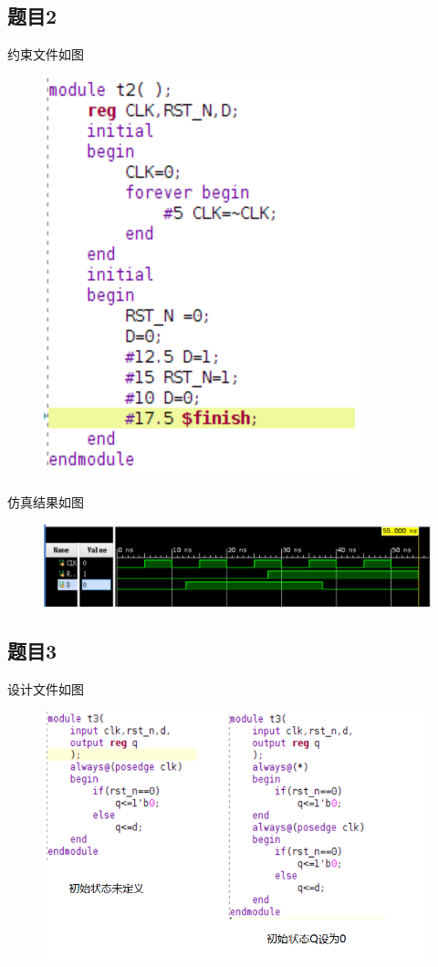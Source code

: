 \documentclass{article}
\begin{document}
    \clearpage
    \subsection*{题目2} 约束文件如图
    \begin{figure}[htbp]
        \centering
        \includegraphics[scale=1.5]{t2s.png}
    \end{figure}

    仿真结果如图
    \begin{figure}[htbp]
        \centering
        \includegraphics[scale=0.8]{t2.png}
    \end{figure}

    \clearpage

    \subsection*{题目3}
    设计文件如图
    \begin{figure}[htbp]
        \centering
        \includegraphics[]{t3v.png}
    \end{figure}
\end{document}
